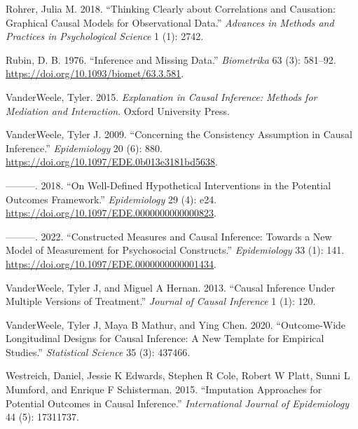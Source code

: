 \documentclass[
  singlecolumn]{report}
\newlength{\cslhangindent}
\newlength{\cslentryspacingunit} %
\newenvironment{CSLReferences}[2] %
 {%
  \setlength{\parindent}{0pt}
  \ifodd #1
  \let\oldpar\par
  \def\par{\hangindent=\cslhangindent\oldpar}
  \fi
  \setlength{\parskip}{#2\cslentryspacingunit}
 }%
 {}
\begin{document}
\begin{CSLReferences}{1}{0}
\leavevmode{}%
Rohrer, Julia M. 2018. {``Thinking Clearly about Correlations and
Causation: Graphical Causal Models for Observational Data.''}
\emph{Advances in Methods and Practices in Psychological Science} 1 (1):
2742.

\leavevmode{}%
Rubin, D. B. 1976. {``Inference and Missing Data.''} \emph{Biometrika}
63 (3): 581--92. \url{https://doi.org/10.1093/biomet/63.3.581}.

\leavevmode{}%
VanderWeele, Tyler. 2015. \emph{Explanation in Causal Inference: Methods
for Mediation and Interaction}. Oxford University Press.

\leavevmode{}%
VanderWeele, Tyler J. 2009. {``Concerning the Consistency Assumption in
Causal Inference.''} \emph{Epidemiology} 20 (6): 880.
\url{https://doi.org/10.1097/EDE.0b013e3181bd5638}.

\leavevmode{}%
---------. 2018. {``On Well-Defined Hypothetical Interventions in the
Potential Outcomes Framework.''} \emph{Epidemiology} 29 (4): e24.
\url{https://doi.org/10.1097/EDE.0000000000000823}.

\leavevmode{}%
---------. 2022. {``Constructed Measures and Causal Inference: Towards a
New Model of Measurement for Psychosocial Constructs.''}
\emph{Epidemiology} 33 (1): 141.
\url{https://doi.org/10.1097/EDE.0000000000001434}.

\leavevmode{}%
VanderWeele, Tyler J, and Miguel A Hernan. 2013. {``Causal Inference
Under Multiple Versions of Treatment.''} \emph{Journal of Causal
Inference} 1 (1): 120.

\leavevmode{}%
VanderWeele, Tyler J, Maya B Mathur, and Ying Chen. 2020.
{``Outcome-Wide Longitudinal Designs for Causal Inference: A New
Template for Empirical Studies.''} \emph{Statistical Science} 35 (3):
437466.

\leavevmode{}%
Westreich, Daniel, Jessie K Edwards, Stephen R Cole, Robert W Platt,
Sunni L Mumford, and Enrique F Schisterman. 2015. {``Imputation
Approaches for Potential Outcomes in Causal Inference.''}
\emph{International Journal of Epidemiology} 44 (5): 17311737.

\end{CSLReferences}
\end{document}
